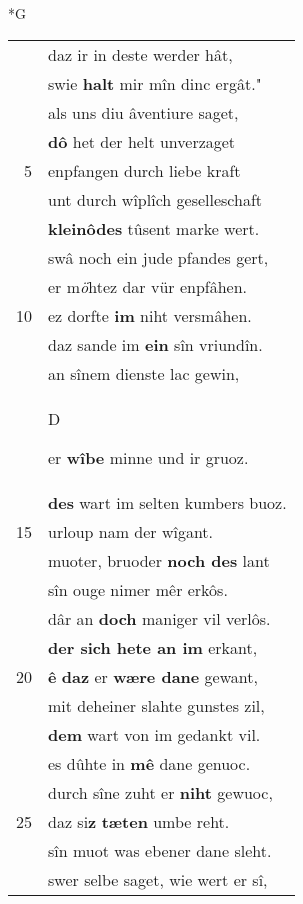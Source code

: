 \documentclass[8pt,a4paper,notitlepage]{article}
\begin{document}
\begin{table}[ht]
\begin{minipage}[t]{0.5\linewidth}
\small
\begin{center}*G
\end{center}
\begin{tabular}{rl}
 & daz ir in deste werder hât,\\ 
 & swie \textbf{halt} mir mîn dinc ergât."\\ 
 & als uns diu âventiure saget,\\ 
 & \textbf{dô} het der helt unverzaget\\ 
5 & enpfangen durch liebe kraft\\ 
 & unt durch wîplîch geselleschaft\\ 
 & \textbf{kleinôdes} tûsent marke wert.\\ 
 & swâ noch ein jude pfandes gert,\\ 
 & er m\textit{ö}htez dar vür enpfâhen.\\ 
10 & ez dorfte \textbf{im} niht versmâhen.\\ 
 & daz sande im \textbf{ein} sîn vriundîn.\\ 
 & an sînem dienste lac gewin,\\ 
 & \begin{large}D\end{large}er \textbf{wîbe} minne und ir gruoz.\\ 
 & \textbf{des} wart im selten kumbers buoz.\\ 
15 & urloup nam der wîgant.\\ 
 & muoter, bruoder \textbf{noch des} lant\\ 
 & sîn ouge nimer mêr erkôs.\\ 
 & dâr an \textbf{doch} maniger vil verlôs.\\ 
 & \textbf{der sich hete an im} erkant,\\ 
20 & \textbf{ê} \textbf{daz} er \textbf{wære dane} gewant,\\ 
 & mit deheiner slahte gunstes zil,\\ 
 & \textbf{dem} wart von im gedankt vil.\\ 
 & es dûhte in \textbf{mê} dane genuoc.\\ 
 & durch sîne zuht er \textbf{niht} gewuoc,\\ 
25 & daz si\textbf{z} \textbf{tæten} umbe reht.\\ 
 & sîn muot was ebener dane sleht.\\ 
 & swer selbe saget, wie wert er sî,\\ 

\end{tabular}
\end{minipage}
\end{table}
\end{document}
